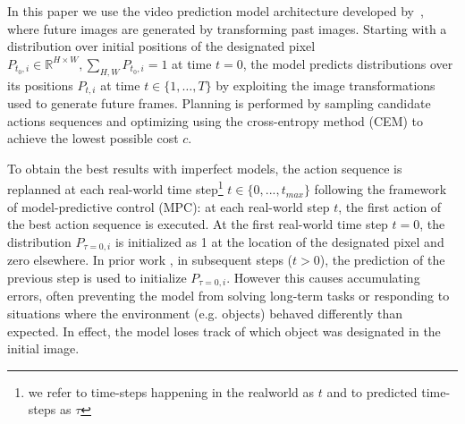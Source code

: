 In this paper we use the video prediction model architecture developed by~\cite{savp}, where future images are generated by transforming past images. Starting with a distribution over initial positions of the designated pixel \mbox{$P_{t_0,i}\in\mathbb{R}^{H\times W}, \sum_{H,W} P_{t_0,i} = 1$} at time $t = 0$, the model predicts distributions over its positions $P_{t,i}$ at time $t \in \{ 1, \dots, T \}$ by exploiting the image transformations used to generate future frames. Planning is performed by sampling candidate actions sequences and optimizing using the cross-entropy method (CEM) \cite{cem-rk-13} to achieve the lowest possible cost $c$.

To obtain the best results with imperfect models, the action sequence is replanned at each real-world time step\footnote{we refer to time-steps happening in the realworld as $t$ and to predicted time-steps as $\tau$} $t \in \{0,...,t_{max}\}$ following the framework of model-predictive control (MPC): at each real-world step $t$, the first action of the best action sequence is executed. 
At the first real-world time step $t=0$, the distribution $P_{\tau=0,i}$ is initialized as 1 at the location of the designated pixel and zero elsewhere. In prior work \cite{sna, foresight}, in subsequent steps ($t > 0$),  the prediction of the previous step is used to initialize $P_{\tau=0,i}$. However this causes accumulating errors, often preventing the model from solving long-term tasks or responding to situations where the environment (e.g. objects) behaved differently than expected. In effect, the model loses track of which object was designated in the initial image.






